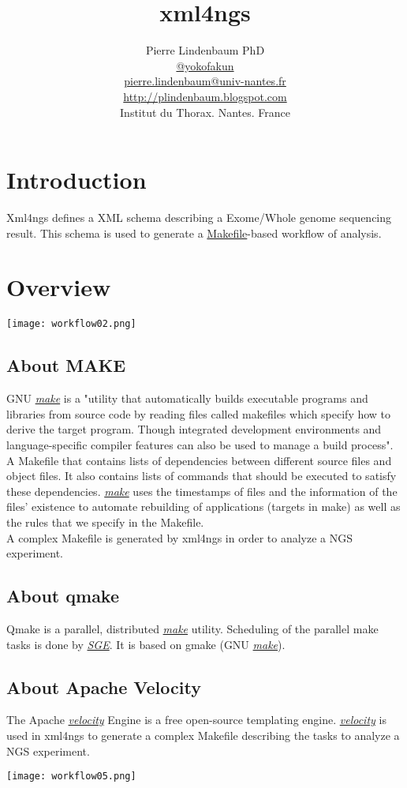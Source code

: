 \documentclass{article}
\author{Pierre Lindenbaum PhD\\\href{https://twitter.com/yokofakun}{@yokofakun}\\ \href{mailto:plindenbaum@yahoo.fr}{pierre.lindenbaum@univ-nantes.fr}\\ \url{http://plindenbaum.blogspot.com}\\Institut du Thorax. Nantes. France}
\title{xml4ngs}
\date{}
\newcommand{\sge}{\href{http://gridscheduler.sourceforge.net}{\em{SGE}}}
\newcommand{\make}{\href{http://www.gnu.org/software/make/manual/make.html}{\em{make}}}
\newcommand{\velocity}{\href{http://velocity.apache.org/}{\em{velocity}}}
\begin{document}
\maketitle

\section{Introduction}

Xml4ngs defines a XML schema describing a Exome/Whole genome sequencing result. This schema
is used to generate a \href{http://www.gnu.org/software/make/manual/make.html}{Makefile}-based workflow of analysis.

\section{Overview}
\begin{center}
\texttt{[image: workflow02.png]}
\end{center}

\subsection{About MAKE}
GNU \make{}  is a "utility that automatically builds executable programs and libraries from source code by reading files called makefiles which specify how to derive the target program. Though integrated development environments and language-specific compiler features can also be used to manage a build process".\\
A Makefile that contains lists of dependencies between different source files and object files. It also contains lists of commands that should be executed to satisfy these dependencies. \make{} uses the timestamps of files and the information of the files' existence to automate rebuilding of applications (targets in make) as well as the rules that we specify in the Makefile.\\
A complex Makefile is generated by xml4ngs in order to analyze a NGS experiment.

\subsection{About qmake}
Qmake is a parallel, distributed \make{} utility. Scheduling of the parallel make tasks is done by \sge{}. It is based on gmake (GNU \make{}).
\subsection{About Apache Velocity}
The Apache \velocity{} Engine is a free open-source templating engine. \velocity{} is used in xml4ngs to generate a complex Makefile describing the tasks to analyze a NGS experiment.
\begin{center}
\texttt{[image: workflow05.png]}
\end{center}
\end{document}
